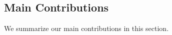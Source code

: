 \documentclass[journal,onecolumn]{IEEEtran}
\theoremstyle{plain}
\theoremstyle{definition}
\theoremstyle{remark}
\begin{document}
\subsection{Main Contributions}

We   summarize our main contributions in this section.


\end{document}
